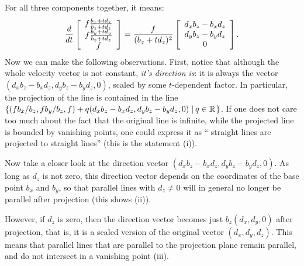 \documentclass{scrartcl}
\begin{document}
For all three components together, it means:
\begin{align*}
  \frac{d}{dt}\mat{c}{
    f \frac{b_x + t d_x}{b_z + t d_z} \\
    f \frac{b_y + t d_y}{b_z + t d_z} \\
    f
  } = 
  \frac{f}{(b_z + t d_z)^2}
  \mat{c}{
     d_x b_z - b_x d_z \\
     d_y b_z - b_y d_z \\
     0
  }.
\end{align*}
Now we can make the following observations.
First, notice that although the whole velocity vector is not constant, 
\emph{it's direction is}: it is always the vector $(
     d_x b_z - b_x d_z,
     d_y b_z - b_y d_z, 0
  )$, scaled by some $t$-dependent factor. 
  In particular, the projection of the line is contained in the 
  line 
  $\setPredicate{(f b_x / b_z, f b_y / b_z, f) + q (d_x b_z - b_x d_z,
  d_y b_z - b_y d_z, 0)}{q \in \Real}$. 
  If one does not care too much 
  about the fact that the original line is infinite, while the projected 
  line is bounded by vanishing points, one could express it as ``
  straight lines are projected to straight lines'' (this is the statement (i)).
  
  Now take a closer look at the direction vector $(d_x b_z - b_x d_z,
  d_y b_z - b_y d_z, 0)$. As long as $d_z$ is not zero, this direction 
  vector depends on the coordinates of the base point $b_x$ and $b_y$,
  so that parallel lines with $d_z\neq 0$ will in general no
  longer be parallel after projection (this shows (ii)).

  However, if $d_z$ is zero, then
  the direction vector becomes just $b_z(d_x, d_y, 0)$ after projection, that is, it is a scaled version of the original vector $(d_x, d_y, d_z)$. This means that
  parallel lines that are parallel to the projection plane remain parallel, 
  and do not intersect in a vanishing point (iii).
\end{document}
